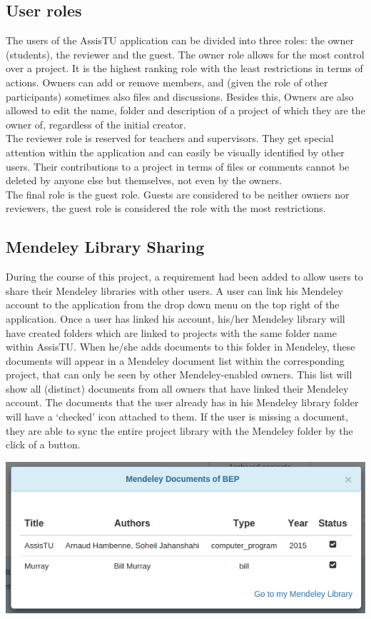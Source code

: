\subsection{User roles}
The users of the AssisTU application can be divided into three roles: the owner (students), the reviewer and the guest. The owner role allows for the most control over a project. It is the highest ranking role with the least restrictions in terms of actions. Owners can add or remove members, and (given the role of other participants) sometimes also files and discussions. Besides this, Owners are also allowed to edit the name, folder and description of a project of which they are the owner of, regardless of the initial creator. \\
The reviewer role is reserved for teachers and supervisors. They get special attention within the application and can easily be visually identified by other users. Their contributions to a project in terms of files or comments cannot be deleted by anyone else but themselves, not even by the owners. \\
The final role is the guest role. Guests are considered to be neither owners nor reviewers, the guest role is considered the role with the most restrictions.

\newpage

\subsection{Mendeley Library Sharing}
During the course of this project, a requirement had been added to allow users to share their Mendeley libraries with other users. A user can link his Mendeley account to the application from the drop down menu on the top right of the application. Once a user has linked his account, his/her Mendeley library will have created folders which are linked to projects with the same folder name within AssisTU. When he/she adds documents to this folder in Mendeley, these documents will appear in a Mendeley document list within the corresponding project, that can only be seen by other Mendeley-enabled owners. This list will show all (distinct) documents from all owners that have linked their Mendeley account. The documents that the user already has in his Mendeley library folder will have a `checked' icon attached to them. If the user is missing a document, they are able to sync the entire project library with the Mendeley folder by the click of a button.

\begin{center}
\includegraphics[scale=0.5]{./img/mendeley.png}
\end{center}

